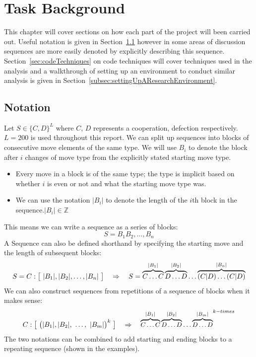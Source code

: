 
\chapter{Task Background}\label{ch:taskBackground}
This chapter will cover sections on how each part of the project will been carried out.
Useful notation is given in Section~\ref{sec:notation} however in some areas of discussion sequences are more easily denoted by explicitly describing this sequence.
Section~\ref{sec:codeTechniques} on code techniques will cover techniques used in the analysis and a walkthrough of setting up an environment to conduct similar analysis is given in Section~\ref{subsec:settingUpAResearchEnvironment}.

\section{Notation}\label{sec:notation}
Let \(S\in\{C, D\}^L\) where \(C\), \(D\) represents a cooperation, defection respectively.\(L=200\) is used throughout this report.
We can split up sequences into blocks of consecutive move elements of the same type.
We will use \(B_i\) to denote the block after \(i\) changes of move type from the explicitly stated starting move type.
\begin{itemize}
    \item Every move in a block is of the same type;
    the type is implicit based on whether \(i\) is even or not and what the starting move type was.
    \item We can use the notation \(|B_i|\) to denote the length of the \(i\)th block in the sequence.\(|B_i| \in \mathbb{Z}\)
\end{itemize}

This means we can write a sequence as a series of blocks:
\[S= B_1 B_2,\ldots,B_n\]
A Sequence can also be defined shorthand by specifying the starting move and the length of subsequent blocks:
\[S = C:\big{[}\ |B_1|,|B_2|,\ldots,|B_n|\ \big{]} \quad \Rightarrow \quad S=\overbrace{C\ldots C}^{|B_1|}\overbrace{D\ldots D}^{|B_2|}\ldots\overbrace{(C|D)\ldots (C|D)}^{|B_n|} \]
We can also construct sequences from repetitions of a sequence of blocks when it makes sense:
\[C:\big{[}\ \big{(}|B_1|,|B_2|,\ \ldots,\ |B_m|\big{)}^{k}\ \big{]} \quad \Rightarrow \quad {\small{\overbrace{C\ldots C}^{|B_1|}\overbrace{D\ldots D}^{|B_2|}\ldots\overbrace{D\ldots D}^{|B_m|}}}^{k-times}\]
The two notations can be combined to add starting and ending blocks to a repeating sequence (shown in the examples).

